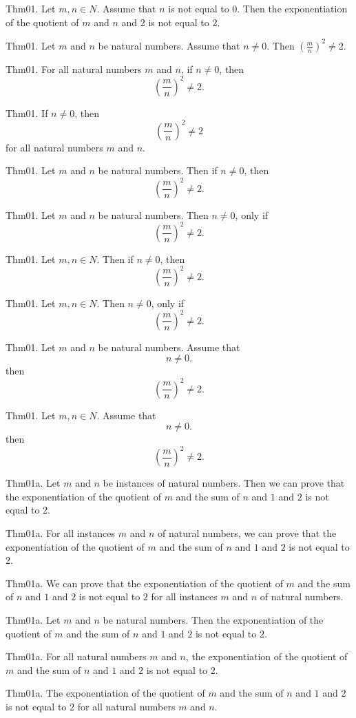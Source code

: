 \documentclass{article}
\begin{document}
Thm01. Let $m , n \in N$. Assume that $n$ is not equal to $0$. Then the exponentiation of the quotient of $m$ and $n$ and $2$ is not equal to $2$.

Thm01. Let $m$ and $n$ be natural numbers. Assume that $n \neq 0$. Then $(\frac{ m}{n})^ {2}\neq 2$.

Thm01. For all natural numbers $m$ and $n$, if $n \neq 0$, then $$(\frac{ m}{n})^ {2}\neq 2.$$

Thm01. If $n \neq 0$, then $$(\frac{ m}{n})^ {2}\neq 2$$ for all natural numbers $m$ and $n$.

Thm01. Let $m$ and $n$ be natural numbers. Then if $n \neq 0$, then $$(\frac{ m}{n})^ {2}\neq 2.$$

Thm01. Let $m$ and $n$ be natural numbers. Then $n \neq 0$, only if $$(\frac{ m}{n})^ {2}\neq 2.$$

Thm01. Let $m , n \in N$. Then if $n \neq 0$, then $$(\frac{ m}{n})^ {2}\neq 2.$$

Thm01. Let $m , n \in N$. Then $n \neq 0$, only if $$(\frac{ m}{n})^ {2}\neq 2.$$

Thm01. Let $m$ and $n$ be natural numbers. Assume that $$n \neq 0.$$ then $$(\frac{ m}{n})^ {2}\neq 2.$$

Thm01. Let $m , n \in N$. Assume that $$n \neq 0.$$ then $$(\frac{ m}{n})^ {2}\neq 2.$$

Thm01a. Let $m$ and $n$ be instances of natural numbers. Then we can prove that the exponentiation of the quotient of $m$ and the sum of $n$ and $1$ and $2$ is not equal to $2$.

Thm01a. For all instances $m$ and $n$ of natural numbers, we can prove that the exponentiation of the quotient of $m$ and the sum of $n$ and $1$ and $2$ is not equal to $2$.

Thm01a. We can prove that the exponentiation of the quotient of $m$ and the sum of $n$ and $1$ and $2$ is not equal to $2$ for all instances $m$ and $n$ of natural numbers.

Thm01a. Let $m$ and $n$ be natural numbers. Then the exponentiation of the quotient of $m$ and the sum of $n$ and $1$ and $2$ is not equal to $2$.

Thm01a. For all natural numbers $m$ and $n$, the exponentiation of the quotient of $m$ and the sum of $n$ and $1$ and $2$ is not equal to $2$.

Thm01a. The exponentiation of the quotient of $m$ and the sum of $n$ and $1$ and $2$ is not equal to $2$ for all natural numbers $m$ and $n$.
\end{document}
